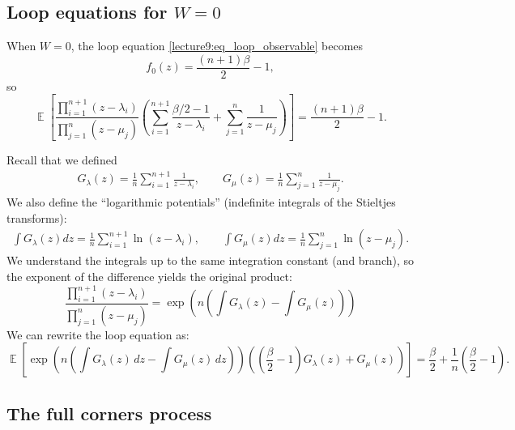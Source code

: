 \documentclass[letterpaper,11pt,oneside,reqno]{book}
\numberwithin{equation}{chapter}  %
\theoremstyle{definition}
\begin{document}
\subsection{Loop equations for $W=0$}

When $W=0$, the loop equation \eqref{lecture9:eq_loop_observable} becomes
\begin{equation*}
	f_0(z)=\frac{(n+1)\beta}{2}-1,
\end{equation*}
so
\begin{equation*}
		\operatorname{\mathbb{E}}\left[\frac{\prod_{i=1}^{n+1}(z-\lambda_i)}{\prod_{j=1}^n(z-\mu_j)}\left(\sum_{i=1}^{n+1}\frac{\beta/2-1}{z-\lambda_i} + \sum_{j=1}^n\frac{1}{z-\mu_j}\right)\right] = \frac{(n+1)\beta}{2}-1.
\end{equation*}

Recall that we defined
\begin{align*}
G_\lambda(z) = \frac{1}{n}\sum_{i=1}^{n+1}\frac{1}{z-\lambda_i},
\qquad
G_\mu(z) = \frac{1}{n}\sum_{j=1}^n\frac{1}{z-\mu_j}.
\end{align*}
We also define the ``logarithmic potentials'' (indefinite integrals of the Stieltjes transforms):
\begin{align*}
\int G_\lambda(z)dz = \frac{1}{n}\sum_{i=1}^{n+1}\ln(z-\lambda_i), \qquad
\int G_\mu(z)dz = \frac{1}{n}\sum_{j=1}^n\ln(z-\mu_j).
\end{align*}
We understand the integrals up to the same integration constant (and branch), so the exponent of the difference
yields the original product:
\begin{equation*}
	\frac{\prod_{i=1}^{n+1}(z-\lambda_i)}{\prod_{j=1}^n(z-\mu_j)} = \exp\left(n\left(\int G_\lambda(z) - \int G_\mu(z)\right)\right)
\end{equation*}
We can rewrite
the loop equation
as:
\begin{equation} \label{lecture9:eq:stieltjes_transform_eq}
	\operatorname{\mathbb{E}}\left[\exp\left(n\left(\int G_\lambda(z)\,dz - \int G_\mu(z)\,dz\right)\right)\left(\left(\frac{\beta}{2}-1\right)G_\lambda(z) + G_\mu(z)\right)\right] = \frac{\beta}{2} + \frac{1}{n}\left(\frac{\beta}{2}-1\right).
\end{equation}

\subsection{The full corners process}
\end{document}

